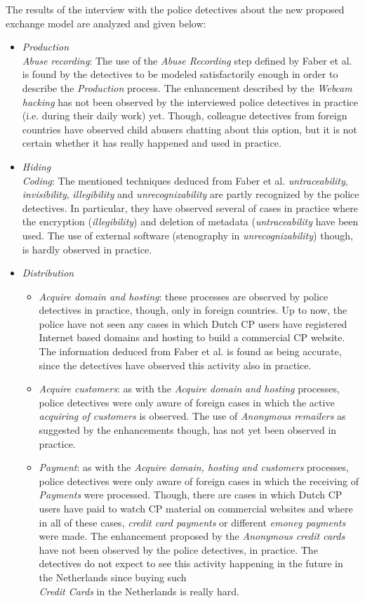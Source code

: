 \documentclass{sig-alternate-br}
\begin{document}
The results of the interview with the police detectives about the new proposed exchange model are analyzed and given below:
\begin{itemize}
	\item \textit{Production}\\
		\textit{Abuse recording}: The use of the \textit{Abuse Recording} step defined by Faber et al. \cite{en2011phishing} is found by the detectives to be modeled satisfactorily enough in order to describe the \textit{Production} process. The enhancement described by the \textit{Webcam hacking} \cite{mishna2009ongoing, salomon2010examples} has not been observed by the interviewed police detectives in practice (i.e. during their daily work) yet. Though, colleague detectives from foreign countries have observed child abusers chatting about this option, but it is not certain whether it has really happened and used in practice.
	\item \textit{Hiding}\\
		\textit{Coding}: The mentioned techniques deduced from Faber et al. \cite{en2011phishing} \textit{untraceability}, \textit{invisibility}, \textit{illegibility} and \textit{unrecognizability} are partly recognized by the police detectives. In particular, they have observed several of cases in practice where the encryption (\textit{illegibility}) and deletion of metadata (\textit{untraceability} have been used. The use of external software (stenography in \textit{unrecognizability}) though, is hardly observed in practice.
	\item \textit{Distribution}
		\begin{itemize}
			\item \textit{Acquire domain and hosting}: these processes are observed by police detectives in practice, though, only in foreign countries. Up to now, the police have not seen any cases in which Dutch CP users have registered Internet based domains and hosting to build a commercial CP website. The information deduced from Faber et al. \cite{en2011phishing} is found as being accurate, since the detectives have observed this activity also in practice.
			\item \textit{Acquire customers}: as with the \textit{Acquire domain and hosting} processes, police detectives were only aware of foreign cases in which the active \textit{acquiring of customers} is observed. The use of \textit{Anonymous remailers} as suggested by the enhancements though, has not yet been observed in practice.
			\item \textit{Payment}: as with the \textit{Acquire domain, hosting and customers} processes, police detectives were only aware of foreign cases in which the receiving of \textit{Payments} were processed. Though, there are cases in which Dutch CP users have paid to watch CP material on commercial websites and where in all of these cases, \textit{credit card payments} or different \textit{emoney payments} were made. The enhancement proposed by the \textit{Anonymous credit cards} have not been observed by the police detectives, in practice. The detectives do not expect to see this activity happening in the future in the Netherlands since buying such \\ \textit{Credit Cards} in the Netherlands is really hard.

\end{itemize}
\end{itemize}
\end{document}
